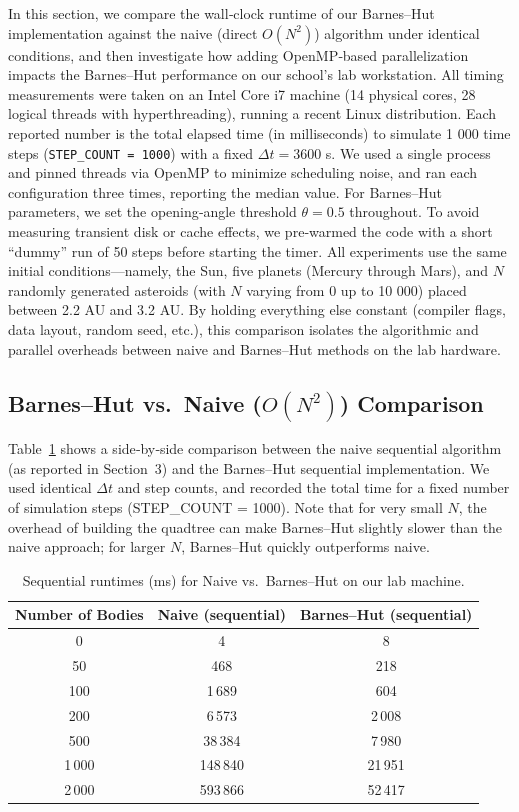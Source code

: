 \documentclass{article}
\begin{document}
\noindent
In this section, we compare the wall‐clock runtime of our Barnes–Hut implementation against the naive (direct \(O(N^2)\)) algorithm under identical conditions, and then investigate how adding OpenMP‐based parallelization impacts the Barnes–Hut performance on our school’s lab workstation. All timing measurements were taken on an Intel Core i7 machine (14 physical cores, 28 logical threads with hyperthreading), running a recent Linux distribution. Each reported number is the total elapsed time (in milliseconds) to simulate 1 000 time steps (\texttt{STEP\_COUNT = 1000}) with a fixed \(\Delta t = 3600\) s. We used a single process and pinned threads via OpenMP to minimize scheduling noise, and ran each configuration three times, reporting the median value. For Barnes–Hut parameters, we set the opening‐angle threshold \(\theta = 0.5\) throughout. To avoid measuring transient disk or cache effects, we pre‐warmed the code with a short “dummy” run of 50 steps before starting the timer. All experiments use the same initial conditions—namely, the Sun, five planets (Mercury through Mars), and \(N\) randomly generated asteroids (with \(N\) varying from 0 up to 10 000) placed between 2.2 AU and 3.2 AU. By holding everything else constant (compiler flags, data layout, random seed, etc.), this comparison isolates the algorithmic and parallel overheads between naive and Barnes–Hut methods on the lab hardware.


\subsection{Barnes–Hut vs.\ Naive ($O(N^2)$) Comparison}

Table~\ref{tab:naive_vs_bh} shows a side‐by‐side comparison between the naive sequential algorithm (as reported in Section~3) and the Barnes–Hut sequential implementation.  We used identical $\Delta t$ and step counts, and recorded the total time for a fixed number of simulation steps (STEP\_COUNT = 1000).  Note that for very small $N$, the overhead of building the quadtree can make Barnes–Hut slightly slower than the naive approach; for larger $N$, Barnes–Hut quickly outperforms naive.

\begin{table}[H]
    \centering
    \begin{tabular}{|c|c|c|}
    \hline
    \textbf{Number of Bodies} & \textbf{Naive (sequential)} & \textbf{Barnes–Hut (sequential)} \\
    \hline
    0     &     4    &      8    \\ 
    50    &   468    &    218    \\ 
    100   &  1\,689  &    604    \\ 
    200   &  6\,573  &  2\,008   \\ 
    500   & 38\,384  &  7\,980   \\ 
    1\,000 & 148\,840 & 21\,951   \\ 
    2\,000 & 593\,866 & 52\,417   \\ 
    \hline
    \end{tabular}
    \caption{Sequential runtimes (ms) for Naive vs.\ Barnes–Hut on our lab machine.}
    \label{tab:naive_vs_bh}
\end{table}
\end{document}
